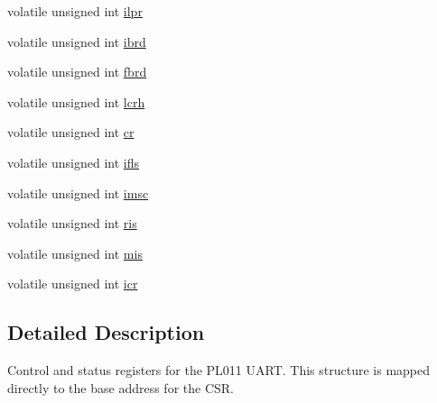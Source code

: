 \begin{DoxyCompactItemize}
\item 
volatile unsigned int \hyperlink{structpl011__uart__csreg_a1f5d2e9afca91989656f0b6213fbb822}{ilpr}
\item 
volatile unsigned int \hyperlink{structpl011__uart__csreg_a33c3d060bb12eb191078cd8d69f22cb0}{ibrd}
\item 
volatile unsigned int \hyperlink{structpl011__uart__csreg_a730bd72a53bbd682874cb801cc93f845}{fbrd}
\item 
volatile unsigned int \hyperlink{structpl011__uart__csreg_aadc71df89adc006df0c6c4a34cf9f01e}{lcrh}
\item 
volatile unsigned int \hyperlink{structpl011__uart__csreg_a28704fd0e3afa5f16b1d337a3d86f40b}{cr}
\item 
volatile unsigned int \hyperlink{structpl011__uart__csreg_a09d7f2bf1e7d0f792d9c1d679b09b34c}{ifls}
\item 
volatile unsigned int \hyperlink{structpl011__uart__csreg_a913643e822176d913092cb4d4c3be374}{imsc}
\item 
volatile unsigned int \hyperlink{structpl011__uart__csreg_a6b13c9328a5456cc564b718a1767aad9}{ris}
\item 
volatile unsigned int \hyperlink{structpl011__uart__csreg_aff917744b9eaab68caead0b3eda10b4d}{mis}
\item 
volatile unsigned int \hyperlink{structpl011__uart__csreg_aa6901cdfcd428738189f34ac3cabb85e}{icr}
\end{DoxyCompactItemize}


\subsection{Detailed Description}
Control and status registers for the P\-L011 U\-A\-R\-T. This structure is mapped directly to the base address for the C\-S\-R. 

